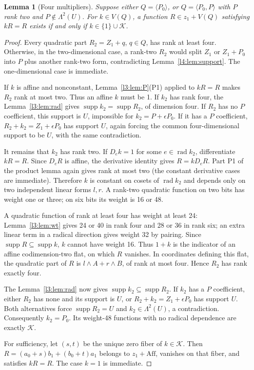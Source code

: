 \documentclass[11pt,a4paper]{article}
\theoremstyle{plain}
\newtheorem{lemma}[theorem]{Lemma}
\theoremstyle{remark}
\newcommand{\Aff}{\mathrm{Aff}}
\newcommand{\supp}{\operatorname{supp}}
\newcommand{\rad}{\operatorname{rad}}
\begin{document}
\begin{lemma}[Four multipliers]\label{l2:lem:four}
Suppose either $Q=\langle P_0\rangle$, or $Q=\langle P_0,P\rangle$ with $P$ rank two and $P\notin\Lambda^2(U)$. For $k\in V(Q)$, a function $R\in z_1+V(Q)$ satisfying $kR=R$ exists if and only if $k\in\{1\}\cup\mathcal K$.
\end{lemma}
\begin{proof}
Every quadratic part $R_2=Z_1+q$, $q\in Q$, has rank at least four. Otherwise, in the two-dimensional case, a rank-two $R_2$ would split $Z_1$ or $Z_1+P_0$ into $P$ plus another rank-two form, contradicting Lemma~\ref{l4:lem:support}. The one-dimensional case is immediate.

If $k$ is affine and nonconstant, Lemma~\ref{l3:lem:P}(P1) applied to $kR=R$ makes $R_2$ rank at most two. Thus an affine $k$ must be 1. If $k_2$ has rank four, the Lemma~\ref{l3:lem:rad} gives $\supp k_2=\supp R_2$, of dimension four. If $R_2$ has no $P$ coefficient, this support is $U$, impossible for $k_2=P+\epsilon P_0$. If it has a $P$ coefficient, $R_2+k_2=Z_1+\epsilon P_0$ has support $U$, again forcing the common four-dimensional support to be $U$, with the same contradiction.

It remains that $k_2$ has rank two. If $D_ek=1$ for some $e\in\rad k_2$, differentiate $kR=R$. Since $D_eR$ is affine, the derivative identity gives $R=kD_eR$. Part P1 of the product lemma again gives rank at most two (the constant derivative cases are immediate). Therefore $k$ is constant on cosets of $\rad k_2$ and depends only on two independent linear forms $l,r$. A rank-two quadratic function on two bits has weight one or three; on six bits its weight is 16 or 48.

A quadratic function of rank at least four has weight at least 24: Lemma~\ref{l3:lem:wt} gives 24 or 40 in rank four and 28 or 36 in rank six; an extra linear term in a radical direction gives weight 32 by pairing. Since $\supp R\subseteq\supp k$, $k$ cannot have weight 16. Thus $1+k$ is the indicator of an affine codimension-two flat, on which $R$ vanishes. In coordinates defining this flat, the quadratic part of $R$ is $l\wedge A+r\wedge B$, of rank at most four. Hence $R_2$ has rank exactly four.

The Lemma~\ref{l3:lem:rad} now gives $\supp k_2\subseteq\supp R_2$. If $k_2$ has a $P$ coefficient, either $R_2$ has none and its support is $U$, or $R_2+k_2=Z_1+\epsilon P_0$ has support $U$. Both alternatives force $\supp R_2=U$ and $k_2\in\Lambda^2(U)$, a contradiction. Consequently $k_2=P_0$. Its weight-48 functions with no radical dependence are exactly $\mathcal K$.

For sufficiency, let $(s,t)$ be the unique zero fiber of $k\in\mathcal K$. Then $R=(a_0+s)b_1+(b_0+t)a_1$ belongs to $z_1+\Aff$, vanishes on that fiber, and satisfies $kR=R$. The case $k=1$ is immediate.
\end{proof}
\end{document}

